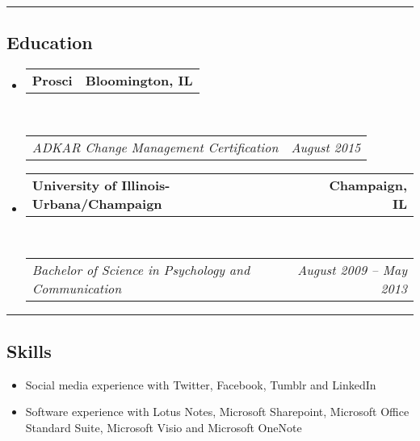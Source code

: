 \documentclass[10pt,letterpaper]{article}
\makeatletter
\newcommand{\headerrow}[2]
{\begin{tabular*}{\linewidth}{l@{\extracolsep{\fill}}r}
	#1 &
	#2 \\
\end{tabular*}}
\makeatother
\begin{document}
\hrule
\vspace{-0.4em}
\subsection*{Education}

\begin{itemize}
	\parskip=0.1em

	\item
	\headerrow
		{\textbf{Prosci}}
		{\textbf{Bloomington, IL}}
	\\
	\headerrow
		{\emph{ADKAR Change Management Certification}}
		{\emph{August 2015}}

	\item
	\headerrow
		{\textbf{University of Illinois-Urbana/Champaign}}
		{\textbf{Champaign, IL}}
	\\
	\headerrow
		{\emph{Bachelor of Science in Psychology and Communication}}
		{\emph{August 2009 -- May 2013}}

\end{itemize}

\hrule
\vspace{-0.4em}
\subsection*{Skills}

\begin{itemize}
	\item Social media experience with Twitter, Facebook, Tumblr and LinkedIn
        \item Software experience with Lotus Notes, Microsoft Sharepoint, Microsoft Office Standard Suite, Microsoft
        Visio and Microsoft OneNote
\end{itemize}
\end{document}
